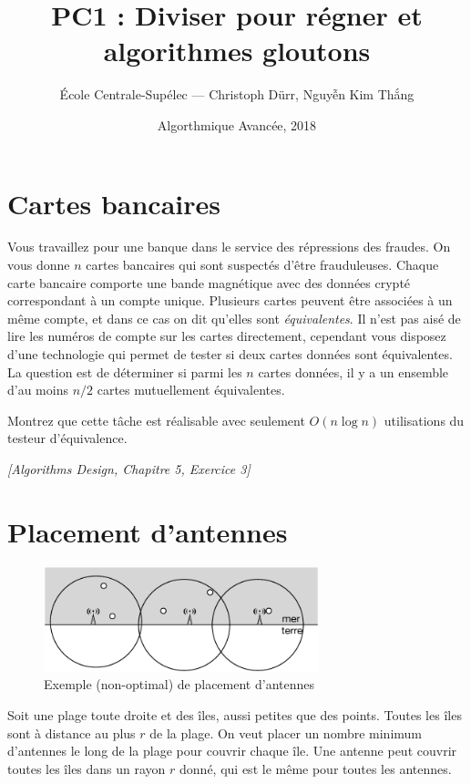 \documentclass[12pt]{article}
\title{PC1 : Diviser pour régner et algorithmes gloutons}
\author{École Centrale-Supélec --- Christoph Dürr, Nguyễn Kim Thắng}
\date{Algorthmique Avancée, 2018}
\newcommand{\source}[1]{\begin{flushright}\emph{[#1]}\end{flushright}}
\begin{document}
    \maketitle

    \section{Cartes bancaires}



    Vous travaillez pour une banque dans le service des répressions des fraudes.  On vous donne $n$ cartes bancaires qui sont suspectés d'être frauduleuses. Chaque carte bancaire comporte une bande magnétique avec des données crypté correspondant à un compte unique. Plusieurs cartes peuvent être associées à un même compte, et dans ce cas on dit qu'elles sont \emph{équivalentes}.
    Il n'est pas aisé de lire les numéros de compte sur les cartes directement, cependant
    vous disposez d'une technologie qui permet de tester si deux cartes données sont équivalentes.
    La question est de déterminer si parmi les $n$ cartes données, il y a un ensemble d'au moins $n/2$ cartes mutuellement équivalentes.

    Montrez que cette tâche est réalisable avec seulement $O(n \log n)$ utilisations du testeur d'équivalence.

\source{Algorithms Design, Chapitre 5, Exercice 3}

    \section{Placement d'antennes}


\begin{figure}[h]
\centerline{\includegraphics[width=8cm]{radar-disc}}
\caption{Exemple (non-optimal) de placement d'antennes}
\end{figure}

Soit une plage toute droite et des îles, aussi petites que des points.
Toutes les îles sont à distance au plus $r$ de la plage.
On veut placer un nombre minimum d'antennes le long de la plage pour couvrir chaque île.  Une antenne peut couvrir toutes les îles dans un rayon $r$ donné, qui est le même pour toutes les antennes.
\end{document}
